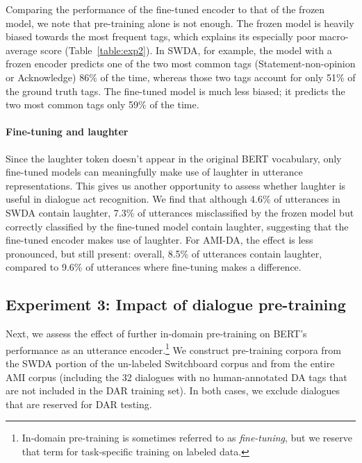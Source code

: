 \documentclass[11pt,a4paper]{article}
\begin{document}
Comparing the performance of the fine-tuned encoder to that of the frozen model, we note that pre-training alone is not enough.
The frozen model is heavily biased towards the most frequent tags, which explains its especially poor macro-average score (Table~\ref{table:exp2}).
In SWDA, for example, the model with a frozen encoder predicts one of the two most common tags (Statement-non-opinion or Acknowledge) 86\% of the time, whereas those two
tags account for only 51\% of the ground truth tags.
The fine-tuned model is much less biased; it predicts the two most common tags only 59\% of the time.




\paragraph{Fine-tuning and laughter}
Since the laughter token doesn't appear in the original BERT vocabulary, only fine-tuned models can meaningfully make use of laughter in utterance representations. 
This gives us another opportunity to assess whether laughter is useful in dialogue act recognition.
We find that although 4.6\% of utterances in SWDA contain laughter, 
7.3\% of utterances misclassified by the frozen model but correctly classified by the fine-tuned model contain laughter, 
suggesting that the fine-tuned encoder makes use of laughter. 
For AMI-DA, the effect is less pronounced, but still present: 
overall, 8.5\% of utterances contain laughter, 
compared to 9.6\% of utterances where fine-tuning makes a difference. 

\subsection{Experiment 3: Impact of dialogue pre-training} \label{sec:experiment3} %

Next, we assess the effect of further in-domain pre-training on BERT's performance as an utterance encoder.\footnote{
In-domain pre-training is sometimes referred to as \textit{fine-tuning}, but we reserve that term for task-specific training on labeled data.}
We construct pre-training corpora from the SWDA portion of the un-labeled Switchboard corpus and from the entire AMI corpus (including the 32 dialogues with no human-annotated DA tags that are not included in the DAR training set).
In both cases, we exclude dialogues that are reserved for DAR testing.
\end{document}
